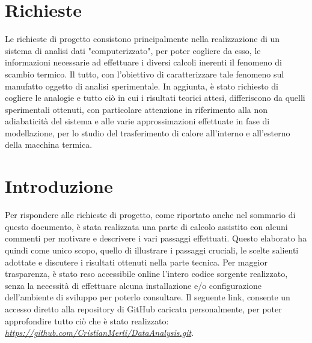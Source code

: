 \documentclass[a4paper,10pt]{article}                                                                                       %
\begin{document}
\section{Richieste}                                                                                                         %
\label{sec:project_request}                                                                                                 %
  Le richieste di progetto consistono principalmente nella realizzazione di un sistema di analisi dati "computerizzato",
  per poter cogliere da esso, le informazioni necessarie ad effettuare i diversi calcoli inerenti il fenomeno di scambio
  termico. Il tutto, con l'obiettivo di caratterizzare tale fenomeno sul manufatto oggetto di analisi sperimentale. In
  aggiunta, è stato richiesto di cogliere le analogie e tutto ciò in cui i risultati teorici attesi, differiscono da
  quelli sperimentali ottenuti, con particolare attenzione in riferimento alla non adiabaticità del sistema e alle varie
  approssimazioni effettuate in fase di modellazione, per lo studio del trasferimento di calore all'interno e all'esterno
  della macchina termica.

\section{Introduzione}                                                                                                      %
\label{sec:introduction}                                                                                                    %
  Per rispondere alle richieste di progetto, come riportato anche nel sommario di questo documento, è stata
  realizzata una parte di calcolo assistito con alcuni commenti per motivare e descrivere i vari passaggi effettuati.
  Questo elaborato ha quindi come unico scopo, quello di illustrare i passaggi cruciali, le scelte salienti adottate e
  discutere i risultati ottenuti nella parte tecnica. Per maggior trasparenza, è stato reso accessibile online l'intero
  codice sorgente realizzato, senza la necessità di effettuare alcuna installazione e/o configurazione dell'ambiente di
  sviluppo per poterlo consultare. Il seguente link, consente un accesso diretto alla repository di GitHub caricata
  personalmente, per poter approfondire tutto ciò che è stato realizzato:
  \textit{\href{https://github.com/CristianMerli/DataAnalysis.git}{https://github.com/CristianMerli/DataAnalysis.git}}.
\end{document}
